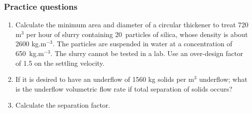 \begin{frame}\frametitle{Practice questions}
	\begin{enumerate}
		\item	Calculate the minimum area and diameter of a circular thickener to treat 720 $\text{m}^3$ per hour of slurry containing 20\micron~particles of silica, whose density is about 2600 kg.$\text{m}^{-3}$. The particles are suspended in water at a concentration of 650~kg.$\text{m}^{-3}$. The slurry cannot be tested in a lab. Use an over-design factor of 1.5 on the settling velocity.
		\item	If it is desired to have an underflow of 1560 kg solids per $\text{m}^{3}$ underflow; what is the underflow volumetric flow rate if total separation of solids occurs?
		\item	Calculate the separation factor.		
	\end{enumerate}	
\end{frame}
